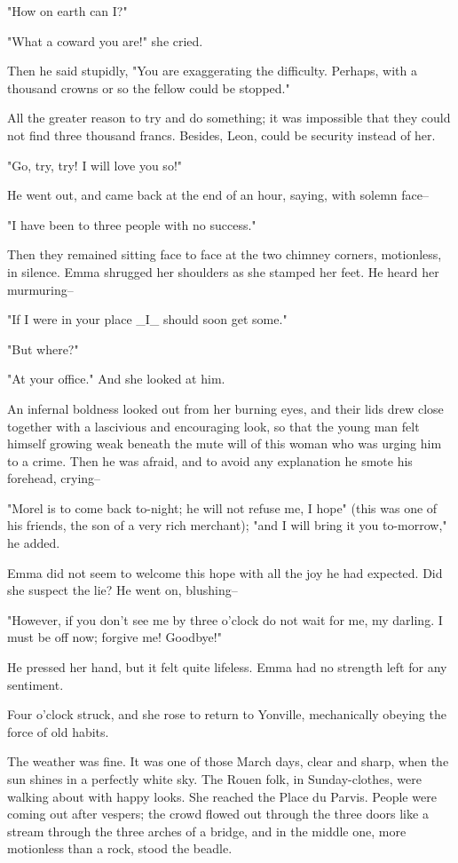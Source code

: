 \documentclass{tufte-book}
\begin{document}
"How on earth can I?"

"What a coward you are!" she cried.

Then he said stupidly, "You are exaggerating the difficulty. Perhaps,
with a thousand crowns or so the fellow could be stopped."

All the greater reason to try and do something; it was impossible that
they could not find three thousand francs. Besides, Leon, could be
security instead of her.

"Go, try, try! I will love you so!"

He went out, and came back at the end of an hour, saying, with solemn
face--

"I have been to three people with no success."

Then they remained sitting face to face at the two chimney corners,
motionless, in silence. Emma shrugged her shoulders as she stamped her
feet. He heard her murmuring--

"If I were in your place _I_ should soon get some."

"But where?"

"At your office." And she looked at him.

An infernal boldness looked out from her burning eyes, and their lids
drew close together with a lascivious and encouraging look, so that the
young man felt himself growing weak beneath the mute will of this woman
who was urging him to a crime. Then he was afraid, and to avoid any
explanation he smote his forehead, crying--

"Morel is to come back to-night; he will not refuse me, I hope" (this
was one of his friends, the son of a very rich merchant); "and I will
bring it you to-morrow," he added.

Emma did not seem to welcome this hope with all the joy he had expected.
Did she suspect the lie? He went on, blushing--

"However, if you don't see me by three o'clock do not wait for me, my
darling. I must be off now; forgive me! Goodbye!"

He pressed her hand, but it felt quite lifeless. Emma had no strength
left for any sentiment.

Four o'clock struck, and she rose to return to Yonville, mechanically
obeying the force of old habits.

The weather was fine. It was one of those March days, clear and sharp,
when the sun shines in a perfectly white sky. The Rouen folk, in
Sunday-clothes, were walking about with happy looks. She reached the
Place du Parvis. People were coming out after vespers; the crowd flowed
out through the three doors like a stream through the three arches of
a bridge, and in the middle one, more motionless than a rock, stood the
beadle.
\end{document}
